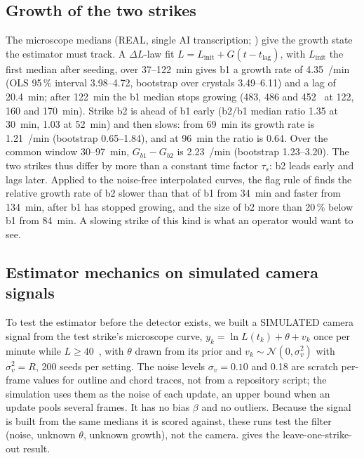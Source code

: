 \subsection{Growth of the two strikes}\label{sec:res-growth}

The microscope medians (REAL, single AI transcription; ) give the growth state the
estimator must track. A $\Delta L$-law fit $L = L_\mathrm{init} + G(t - t_\mathrm{lag})$, with $L_\mathrm{init}$ the first median after
seeding, over 37--122~min gives b1 a growth rate
of 4.35~\um/min (OLS 95\,\% interval 3.98--4.72, bootstrap over crystals 3.49--6.11) and a lag of 20.4~min; after
122~min the b1 median stops growing (483, 486 and 452~\um{} at 122, 160 and 170~min). Strike b2 is ahead of b1 early
(b2/b1 median ratio 1.35 at 30~min, 1.03 at 52~min) and then slows: from 69~min its growth rate is 1.21~\um/min
(bootstrap 0.65--1.84), and at 96~min the ratio is 0.64. Over the common window 30--97~min, $G_{b1} - G_{b2}$ is
2.23~\um/min (bootstrap 1.23--3.20). The two strikes thus differ by more than a constant time factor $\tau_s$: b2 leads early and
lags later. Applied to the noise-free interpolated curves, the flag rule of  finds the relative growth
rate of b2 slower than that of b1 from 34~min and faster from 134~min, after b1 has stopped growing, and the size of
b2 more than 20\,\% below b1 from 84~min. A slowing strike of this kind is what an operator would want to see.

\subsection{Estimator mechanics on simulated camera signals}\label{sec:res-sim}

To test the estimator before the detector exists, we built a SIMULATED camera signal from the test strike's
microscope curve, $y_k = \ln L(t_k) + \theta + v_k$ once per minute while $L \ge 40$~\um, with $\theta$ drawn from its
prior and $v_k \sim \mathcal{N}(0, \sigma_v^2)$ with $\sigma_v^2 = R$, 200 seeds per setting. The noise levels
$\sigma_v = 0.10$ and 0.18 are scratch per-frame values for outline and chord traces, not from a repository script;
the simulation uses them as the noise of each update, an upper bound when an update pools several frames. It has no
bias $\beta$ and no outliers. Because the signal is built from the same medians it is scored against, these runs test
the filter (noise, unknown $\theta$, unknown growth), not the camera.  gives the leave-one-strike-out
result.

